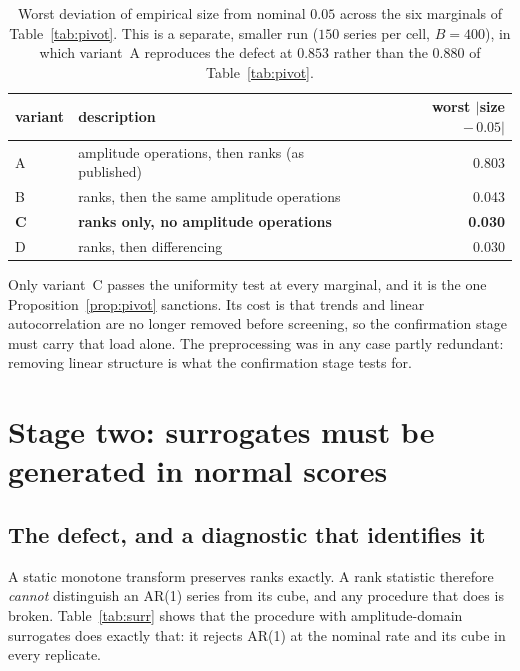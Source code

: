 \documentclass[11pt]{article}
\begin{document}
\begin{table}[h]
\centering
\caption{Worst deviation of empirical size from nominal $0.05$ across the six
marginals of Table~\ref{tab:pivot}. This is a separate, smaller run
($150$ series per cell, $B=400$), in which variant~A reproduces the defect at
$0.853$ rather than the $0.880$ of Table~\ref{tab:pivot}.}
\label{tab:orders}
\begin{tabular}{llr}
\toprule
variant & description & worst $|$size $-\,0.05|$ \\
\midrule
A & amplitude operations, then ranks (as published) & 0.803 \\
B & ranks, then the same amplitude operations & 0.043 \\
\textbf{C} & \textbf{ranks only, no amplitude operations} & \textbf{0.030} \\
D & ranks, then differencing & 0.030 \\
\bottomrule
\end{tabular}
\end{table}

\noindent
Only variant~C passes the uniformity test at every marginal, and it is the one
Proposition~\ref{prop:pivot} sanctions. Its cost is that trends and linear
autocorrelation are no longer removed before screening, so the confirmation
stage must carry that load alone. The preprocessing was in any case partly
redundant: removing linear structure is what the confirmation stage tests for.

\section{Stage two: surrogates must be generated in normal scores}
\label{sec:surr}

\subsection{The defect, and a diagnostic that identifies it}

A static monotone transform preserves ranks exactly. A rank statistic therefore
\emph{cannot} distinguish an AR(1) series from its cube, and any procedure that
does is broken. Table~\ref{tab:surr} shows that the procedure with amplitude-domain
surrogates does exactly that: it rejects AR(1) at the nominal rate and its cube
in every replicate.
\end{document}
